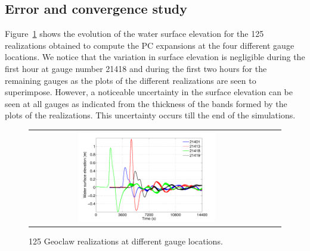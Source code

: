 \subsection{Error and convergence study}
\label{sec:analysis}

Figure~\ref{fig:rlzs} shows the evolution of the
water surface elevation for the 125 realizations obtained 
to compute the PC expansions at the four different gauge 
locations. We notice that the variation in surface elevation 
is negligible during the first hour at gauge number 21418 
and during the first two hours for the remaining gauges
as the plots of the different realizations are seen to superimpose.
However, a noticeable uncertainty in the surface 
elevation can be seen  at all gauges as indicated from the thickness 
of the bands formed by the plots of the realizations. This uncertainty
occurs till the end of the simulations.
\begin{figure}[h]
\centering
\begin{tabular}{clc}        
\includegraphics[width=0.6\textwidth]{./figures/rlzs_gauges.pdf} 
\end{tabular}
\caption{125 Geoclaw realizations at different gauge locations.}
\label{fig:rlzs}
\end{figure}


